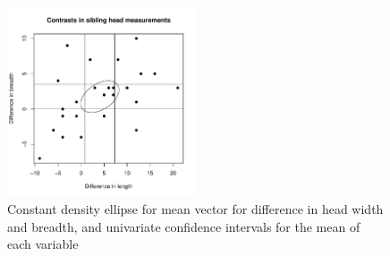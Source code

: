 \begin{figure}
\begin{center}
\includegraphics[width = 0.5\textwidth]{images/cdellipse}
\caption{Constant density ellipse for mean vector for difference in head width and breadth, and univariate confidence intervals for the mean of each variable}
\label{cdellipse}
\end{center}
\end{figure}










